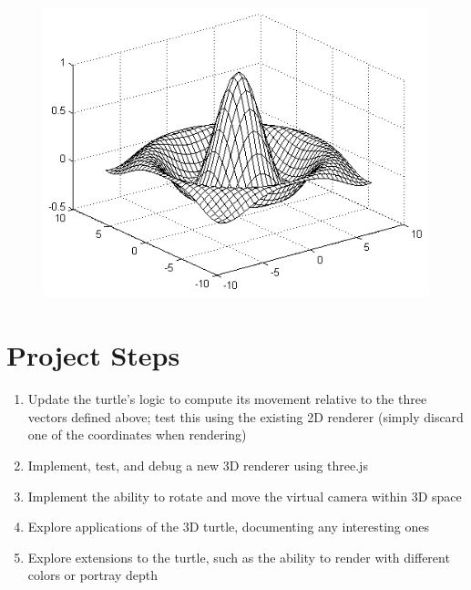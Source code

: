 \documentclass[12pt]{article}
\begin{document}
\begin{figure}[h]
\includegraphics[scale=0.5]{3dmesh}
\centering
\end{figure}

\section{Project Steps}

\begin{enumerate}
\item Update the turtle's logic to compute its movement relative to the three vectors defined above; test this using the existing 2D renderer (simply discard one of the coordinates when rendering)
\item Implement, test, and debug a new 3D renderer using three.js
\item Implement the ability to rotate and move the virtual camera within 3D space
\item Explore applications of the 3D turtle, documenting any interesting ones
\item Explore extensions to the turtle, such as the ability to render with different colors or portray depth
\end{enumerate}
\end{document}
